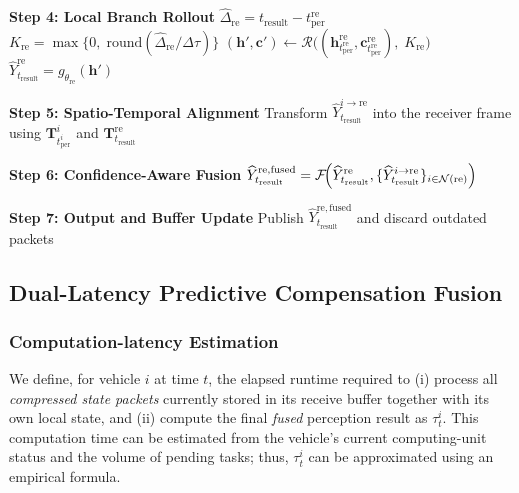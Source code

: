 \begin{algorithm}[t]
\begin{algorithmic}[1]
    \State \textbf{Step 4: Local Branch Rollout}
    \State \ensuremath{\widehat{\Delta}_{\mathrm{re}} = t_{\mathrm{result}} - t^{\mathrm{re}}_{\mathrm{per}}}
    \State \ensuremath{K_{\mathrm{re}} = \max\{0,\; \mathrm{round}(\widehat{\Delta}_{\mathrm{re}}/\Delta\tau)\}}
    \State \ensuremath{(\mathbf{h}',\mathbf{c}') \gets \mathcal{R}\bigl((\mathbf{h}^{\mathrm{re}}_{t^{\mathrm{re}}_{\mathrm{per}}}, \mathbf{c}^{\mathrm{re}}_{t^{\mathrm{re}}_{\mathrm{per}}}),\; K_{\mathrm{re}}\bigr)}
    \State \ensuremath{\widehat{Y}^{\mathrm{re}}_{t_{\mathrm{result}}} = g_{\theta_{\mathrm{re}}}(\mathbf{h}')}

    \State \textbf{Step 5: Spatio-Temporal Alignment}
        \State Transform \ensuremath{\widehat{Y}^{i\rightarrow\mathrm{re}}_{t_{\mathrm{result}}}} into the receiver frame
        \Statex \hspace{\algorithmicindent}using \ensuremath{\mathbf{T}^i_{t^i_{\mathrm{per}}}} and \ensuremath{\mathbf{T}^{\mathrm{re}}_{t_{\mathrm{result}}}}
    \EndFor

    \State \textbf{Step 6: Confidence-Aware Fusion}
    \State $\displaystyle
        \widehat{Y}^{\mathrm{re},\mathrm{fused}}_{t_{\mathrm{result}}}
        = \mathcal{F}\!\Bigl(
            \widehat{Y}^{\mathrm{re}}_{t_{\mathrm{result}}},
            \{\widehat{Y}^{i\rightarrow\mathrm{re}}_{t_{\mathrm{result}}}\}_{i\in\mathcal{N}(\mathrm{re})}
        \Bigr)
    $

    \State \textbf{Step 7: Output and Buffer Update}
    \State Publish \ensuremath{\widehat{Y}^{\mathrm{re},\mathrm{fused}}_{t_{\mathrm{result}}}} and discard outdated packets

\end{algorithmic}
\end{algorithm}











\subsection{Dual-Latency Predictive Compensation Fusion}
\label{subsec:fusion}
\subsubsection{Computation-latency Estimation}
We define, for vehicle $i$ at time $t$, the elapsed runtime required to (i) process all \emph{compressed state packets} currently stored in its receive buffer together with its own local state, and (ii) compute the final \emph{fused} perception result as $\tau^i_t$. This computation time can be estimated from the vehicle's current computing-unit status and the volume of pending tasks; thus, $\tau^i_t$ can be approximated using an empirical formula. 

